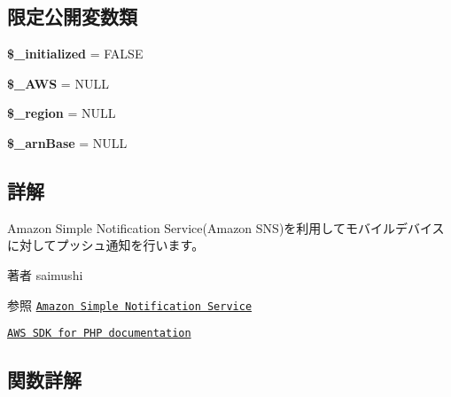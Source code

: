 \subsection*{限定公開変数類}
\begin{DoxyCompactItemize}
\item 
\hypertarget{class_generic_a_w_s_notification_ac7d1c05cfce8b8d945bf964e0bfa60dc}{}{\bfseries \$\+\_\+initialized} = F\+A\+L\+S\+E\label{class_generic_a_w_s_notification_ac7d1c05cfce8b8d945bf964e0bfa60dc}

\item 
\hypertarget{class_generic_a_w_s_notification_acc5ad2fc5cf3635e89828d94a0be2a06}{}{\bfseries \$\+\_\+\+A\+W\+S} = N\+U\+L\+L\label{class_generic_a_w_s_notification_acc5ad2fc5cf3635e89828d94a0be2a06}

\item 
\hypertarget{class_generic_a_w_s_notification_ab77ad23d6d7a0702cd479f642429faab}{}{\bfseries \$\+\_\+region} = N\+U\+L\+L\label{class_generic_a_w_s_notification_ab77ad23d6d7a0702cd479f642429faab}

\item 
\hypertarget{class_generic_a_w_s_notification_a88d738c95c38ceed57d10d4eca86fc0c}{}{\bfseries \$\+\_\+arn\+Base} = N\+U\+L\+L\label{class_generic_a_w_s_notification_a88d738c95c38ceed57d10d4eca86fc0c}

\end{DoxyCompactItemize}


\subsection{詳解}
Amazon Simple Notification Service(\+Amazon S\+N\+S)を利用してモバイルデバイスに対してプッシュ通知を行います。

\begin{DoxyAuthor}{著者}
saimushi 
\end{DoxyAuthor}
\begin{DoxySeeAlso}{参照}
\href{http://aws.amazon.com/sns/}{\tt Amazon Simple Notification Service} 

\href{http://docs.aws.amazon.com/aws-sdk-php/guide/latest/service-sns.html}{\tt A\+W\+S S\+D\+K for P\+H\+P documentation} 
\end{DoxySeeAlso}


\subsection{関数詳解}
\hypertarget{class_generic_a_w_s_notification_a703458780be7636fcd1b6e90d086b92e}{}
